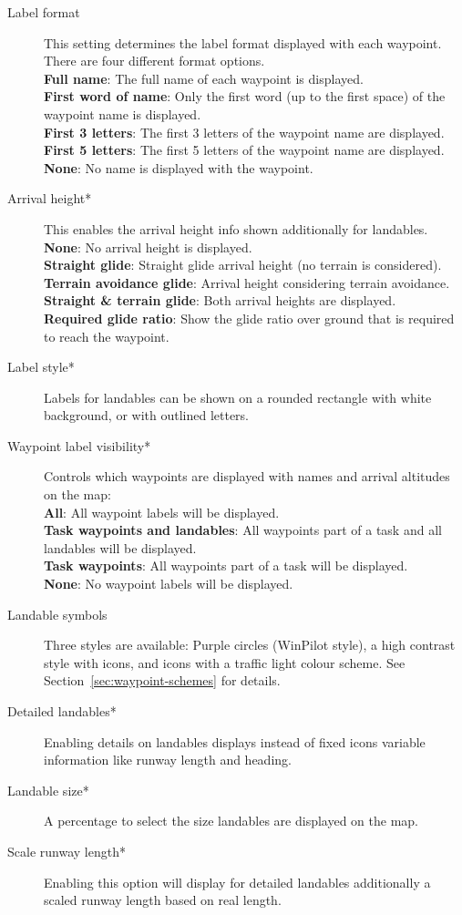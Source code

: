 \begin{description}
\item[Label format]  This setting \label{conf:labels} determines the label format 
  displayed with each waypoint. There are four different format options. \\
  {\bf Full name}: The full name of each waypoint is displayed. \\
  {\bf First word of name}: Only the first word (up to the first space) of the 
  waypoint name is displayed.
 \\
  {\bf First 3 letters}: The first 3 letters of the waypoint name are displayed. \\
  {\bf First 5 letters}: The first 5 letters of the waypoint name are displayed. \\
  {\bf None}: No name is displayed with the waypoint.
\item[Arrival height*] \label{conf:arrivalheight} This enables the arrival height info shown additionally 
  for landables. \\
  {\bf None}: No arrival height is displayed. \\
  {\bf Straight glide}: Straight glide arrival height (no terrain is considered). \\
  {\bf Terrain avoidance glide}: Arrival height considering terrain avoidance. \\
  {\bf Straight \& terrain glide}: Both arrival heights are
  displayed. \\
  {\bf Required glide ratio}: Show the glide ratio over ground that is
  required to reach the waypoint.
\item[Label style*]  Labels for landables can be shown on a rounded rectangle with 
  white background, or with outlined letters.
\item[Waypoint label visibility*]  \label{conf:labelvisibility} Controls which waypoints 
  are displayed with names and arrival altitudes on the map: \\
  {\bf All}: All waypoint labels will be displayed. \\
  {\bf Task waypoints and landables}: All waypoints part of a task and all landables 
  will be displayed. \\
  {\bf Task waypoints}: All waypoints part of a task will be displayed. \\
  {\bf None}:  No waypoint labels will be displayed.
\item[Landable symbols]  \label{conf:waypointicons} Three styles are available:
  Purple circles (WinPilot style), a high contrast style with icons,
  and icons with a traffic light colour scheme. See Section~\ref{sec:waypoint-schemes} for details.
\item[Detailed landables*]  Enabling details on landables displays instead of fixed icons 
  variable information like runway length and heading.
\item[Landable size*]  A percentage to select the size landables are displayed on the map.
\item[Scale runway length*]  Enabling this option will display for detailed landables 
  additionally a scaled runway length based on real length.
\end{description}


